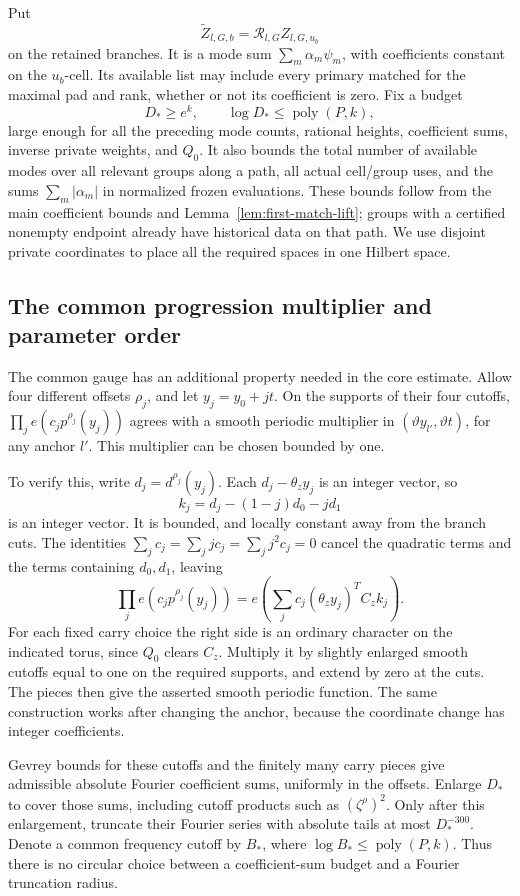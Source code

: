 Put
\[
 \widetilde Z_{l,G,b}=\mathscr R_{l,G}Z_{l,G,u_b}
\]
on the retained branches.  It is a mode sum
\(\sum_m\alpha_m\psi_m\), with coefficients constant on the
\(u_b\)-cell.  Its available list may include every primary matched
for the maximal pad and rank, whether or not its coefficient is zero.
Fix a budget
\[
 D_*\ge e^k,\qquad \log D_*\le\operatorname{poly}(P,k),
\]
large enough for all the preceding mode counts, rational heights,
coefficient sums, inverse private weights, and \(Q_0\).
It also bounds the total number of available modes over all relevant
groups along a path, all actual cell/group uses, and the sums
\(\sum_m|\alpha_m|\) in normalized frozen evaluations.  These bounds
follow from the main coefficient bounds and
Lemma~\ref{lem:first-match-lift}; groups with a certified nonempty
endpoint already have historical data on that path.  We use disjoint
private coordinates to place all the required spaces in one Hilbert
space.

\subsection{The common progression multiplier and parameter order}

The common gauge has an additional property needed in the core
estimate.  Allow four different offsets \(\rho_j\), and let
\(y_j=y_0+jt\).  On the supports of their four cutoffs,
\(\prod_j e(c_jp^{\rho_j}(y_j))\) agrees with a smooth periodic
multiplier in
\((\vartheta y_{l'},\vartheta t)\), for any anchor \(l'\).  This
multiplier can be chosen bounded by one.

To verify this, write \(d_j=d^{\rho_j}(y_j)\).  Each
\(d_j-\theta_z y_j\) is an integer vector, so
\[
 k_j=d_j-(1-j)d_0-jd_1
\]
is an integer vector.  It is bounded, and locally constant away from
the branch cuts.  The identities
\(\sum_jc_j=\sum_jjc_j=\sum_jj^2c_j=0\) cancel the quadratic terms and
the terms containing \(d_0,d_1\), leaving
\[
 \prod_j e(c_jp^{\rho_j}(y_j))
   =e\!\left(\sum_jc_j(\theta_z y_j)^TC_zk_j\right).
\]
For each fixed carry choice the right side is an ordinary character
on the indicated torus, since \(Q_0\) clears \(C_z\).
Multiply it by slightly enlarged smooth cutoffs equal to one on the
required supports, and extend by zero at the cuts.  The pieces then
give the asserted smooth periodic function.  The same construction
works after changing the anchor, because the coordinate change has
integer coefficients.

Gevrey bounds for these cutoffs and the finitely many carry pieces
give admissible absolute Fourier coefficient sums, uniformly in the
offsets.  Enlarge \(D_*\) to cover those sums, including cutoff
products such as \((\zeta^\rho)^2\).  Only after this enlargement,
truncate their Fourier series with absolute tails at most
\(D_*^{-300}\).  Denote a common frequency cutoff by \(B_*\), where
\(\log B_*\le\operatorname{poly}(P,k)\).  Thus there is no circular
choice between a coefficient-sum budget and a Fourier truncation
radius.

